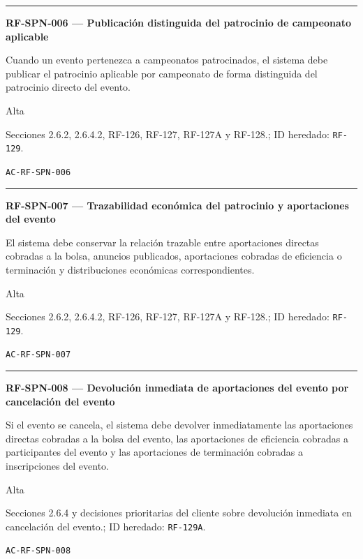 \documentclass[10pt,letterpaper]{article}
\begin{document}
\vspace{0.25em}\hrule\vspace{0.65em}
\noindent\textbf{RF-SPN-006 --- Publicación distinguida del patrocinio de campeonato aplicable}\par
\begin{description}[style=nextline,leftmargin=3.15cm,labelwidth=2.8cm,font=\normalfont\bfseries]
\item[Obligación] Cuando un evento pertenezca a campeonatos patrocinados, el sistema debe publicar el patrocinio aplicable por campeonato de forma distinguida del patrocinio directo del evento.
\item[Prioridad] Alta
\item[Procedencia] Secciones 2.6.2, 2.6.4.2, RF-126, RF-127, RF-127A y RF-128.; ID heredado: \texttt{RF-129}.
\item[Verificación] \texttt{AC-RF-SPN-006}
\end{description}
\vspace{0.25em}\hrule\vspace{0.65em}
\noindent\textbf{RF-SPN-007 --- Trazabilidad económica del patrocinio y aportaciones del evento}\par
\begin{description}[style=nextline,leftmargin=3.15cm,labelwidth=2.8cm,font=\normalfont\bfseries]
\item[Obligación] El sistema debe conservar la relación trazable entre aportaciones directas cobradas a la bolsa, anuncios publicados, aportaciones cobradas de eficiencia o terminación y distribuciones económicas correspondientes.
\item[Prioridad] Alta
\item[Procedencia] Secciones 2.6.2, 2.6.4.2, RF-126, RF-127, RF-127A y RF-128.; ID heredado: \texttt{RF-129}.
\item[Verificación] \texttt{AC-RF-SPN-007}
\end{description}
\vspace{0.25em}\hrule\vspace{0.65em}
\noindent\textbf{RF-SPN-008 --- Devolución inmediata de aportaciones del evento por cancelación del evento}\par
\begin{description}[style=nextline,leftmargin=3.15cm,labelwidth=2.8cm,font=\normalfont\bfseries]
\item[Obligación] Si el evento se cancela, el sistema debe devolver inmediatamente las aportaciones directas cobradas a la bolsa del evento, las aportaciones de eficiencia cobradas a participantes del evento y las aportaciones de terminación cobradas a inscripciones del evento.
\item[Prioridad] Alta
\item[Procedencia] Secciones 2.6.4 y decisiones prioritarias del cliente sobre devolución inmediata en cancelación del evento.; ID heredado: \texttt{RF-129A}.
\item[Verificación] \texttt{AC-RF-SPN-008}
\end{description}
\end{document}
